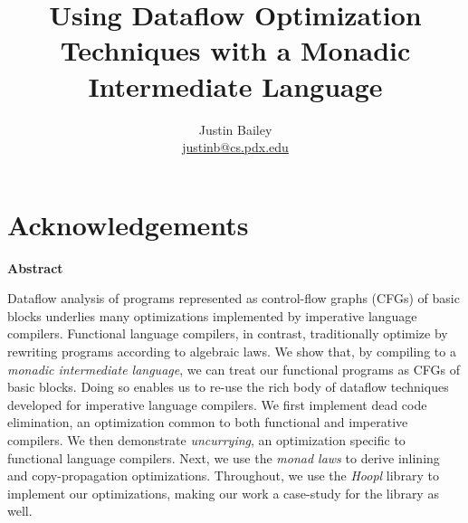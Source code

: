 \dodocclass



\date{}
\author{Justin Bailey \\ \url{justinb@cs.pdx.edu}}
\title{Using Dataflow Optimization Techniques with a Monadic Intermediate Language}
\maketitle 
\thispagestyle{empty}
\newpage
\section*{Acknowledgements}
\thispagestyle{empty}
\newpage
{}
\thispagestyle{plain}

\begin{center}
  \newlength{\abstractLen}
  \begin{minipage}{\abstractLen}
    \begin{center}
      {\sffamily\bfseries Abstract}
    \end{center}
    \bigskip
    \noindent
    Dataflow analysis of programs represented as control-flow graphs
    (CFGs) of basic blocks underlies many optimizations implemented by
    imperative language compilers. Functional language compilers, in
    contrast, traditionally optimize by rewriting programs according to
    algebraic laws. We show that, by compiling to a \emph{monadic
      intermediate language}, we can treat our functional programs as
    CFGs of basic blocks. Doing so enables us to re-use the rich body of
    dataflow techniques developed for imperative language compilers. We
    first implement dead code elimination, an optimization common to
    both functional and imperative compilers. We then demonstrate
    \emph{uncurrying}, an optimization specific to functional language
    compilers. Next, we use the \emph{monad laws} to derive inlining and
    copy-propagation optimizations. %
    Throughout, we use the
    \emph{Hoopl} library to implement our optimizations, making our work
    a case-study for the library as well.
  \end{minipage}
\end{center}



